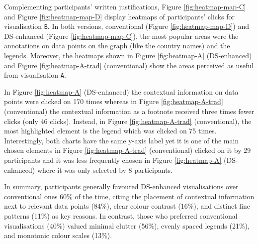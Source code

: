 Complementing participants' written justifications, Figure \ref{fig:heatmap-map-C} and Figure \ref{fig:heatmap-map-D} display heatmaps of participants' clicks for visualisation \texttt{B}. In both versions, conventional (Figure \ref{fig:heatmap-map-D}) and DS-enhanced (Figure \ref{fig:heatmap-map-C}), the most popular areas were the annotations on data points on the graph (like the country names) and the legends. Moreover, the heatmaps shown in Figure \ref{fig:heatmap-A} (DS-enhanced) and Figure \ref{fig:heatmap-A-trad} (conventional) show the areas perceived as useful from visualisation \texttt{A}. 

In Figure \ref{fig:heatmap-A} (DS-enhanced) the contextual information on data points were clicked on 170 times whereas in Figure \ref{fig:heatmap-A-trad} (conventional) the contextual information as a footnote received three times fewer clicks (only 46 clicks). Instead, in Figure \ref{fig:heatmap-A-trad} (conventional), the most highlighted element is the legend which was clicked on 75 times. Interestingly, both charts have the same y-axis label yet it is one of the main chosen elements in Figure \ref{fig:heatmap-A-trad} (conventional) clicked on it by 29 participants and it was less frequently chosen in Figure \ref{fig:heatmap-A} (DS-enhanced) where it was only selected by 8 participants.

In summary, participants generally favoured DS-enhanced visualisations over conventional ones 60\% of the time, citing the placement of contextual information next to relevant data points (84\%), clear colour contrast (16\%), and distinct line patterns (11\%) as key reasons. In contrast, those who preferred conventional visualisations (40\%) valued minimal clutter (56\%), evenly spaced legends (21\%), and monotonic colour scales (13\%).